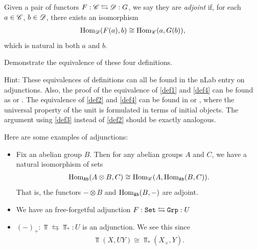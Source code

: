 \documentclass{article}[11pt]
\begin{document}
\begin{definition}\label{def4} Given a pair of functors $F: \mathscr{C} \leftrightarrows \mathscr{D}:G$, we say they are \textit{adjoint} if, for each $a\in \mathscr{C}$, $b\in\mathscr{D}$, there exists an isomorphism
\begin{align*}
	\textup{Hom}_{\mathscr{D}}(F(a), b) \cong \textup{Hom}_{\mathscr{C}} (a, G(b)),
\end{align*}
which is natural in both $a$ and $b$.
\end{definition}

\begin{exercise} Demonstrate the equivalence of these four definitions. 
\end{exercise}

Hint: These equivalences of definitions can all be found in the nLab entry on adjunctions. Also, the proof of the equivalence of \autoref{def1} and \autoref{def4} can be found as  \cite[Theorem 2.2.5]{leinster} or \cite[Theorem 3.9]{mehrle}. The equivalence of \autoref{def2} and \autoref{def4} can be found in \cite[Section 3]{henderson} or \cite[Theorem 2.3.6.]{leinster}, where the universal property of the unit is formulated in terms of initial objects. The argument using \autoref{def3} instead of \autoref{def2} should be exactly analogous.



\begin{examples}\label{exs:adjunctions} Here are some examples of adjunctions:
\begin{itemize}
	\item Fix an abelian group $B$. Then for any abelian groups $A$ and $C$, we have a natural isomorphism of sets
\begin{align*}
	\textup{Hom}_{\texttt{Ab}} (A\otimes B, C) \cong \textup{Hom}_{\mathscr{C}}(A, \textup{Hom}_{\texttt{Ab}} (B,C)).
\end{align*}
That is, the functors $-\otimes B$ and $\textup{Hom}_{\texttt{Ab}} (B, -)$ are adjoint.
	\item We have an free-forgetful adjunction $F: \texttt{Set} \leftrightarrows \texttt{Grp} : U$
	\item $(-)_+ : \Top \leftrightarrows \Top_\ast: U$ is an adjunction. We see this since
	\begin{align*}
		\Top(X,UY) \cong \Top_\ast (X_+, Y).
	\end{align*}
\end{itemize}
\end{examples}
\end{document}
